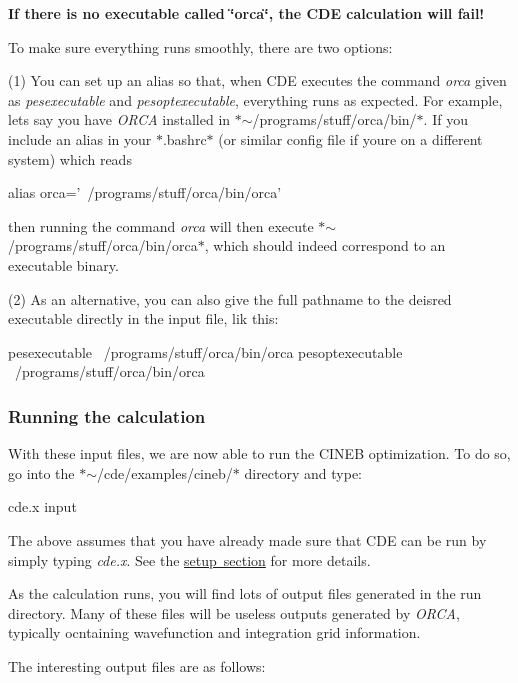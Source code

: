 {\bfseries If there is no executable called \char`\"{}orca\char`\"{}, the C\+DE calculation will fail!}

To make sure everything runs smoothly, there are two options\+:

(1) You can set up an alias so that, when C\+DE executes the command {\itshape orca} given as {\itshape pesexecutable} and {\itshape pesoptexecutable}, everything runs as expected. For example, lets say you have {\itshape O\+R\+CA} installed in $\ast$$\sim$/programs/stuff/orca/bin/$\ast$. If you include an alias in your $\ast$.bashrc$\ast$ (or similar config file if you\textquotesingle{}re on a different system) which reads \begin{DoxyVerb}alias orca='~/programs/stuff/orca/bin/orca'
\end{DoxyVerb}


then running the command {\itshape orca} will then execute $\ast$$\sim$/programs/stuff/orca/bin/orca$\ast$, which should indeed correspond to an executable binary.

(2) As an alternative, you can also give the full pathname to the deisred executable directly in the input file, lik this\+: \begin{DoxyVerb}  pesexecutable ~/programs/stuff/orca/bin/orca
  pesoptexecutable ~/programs/stuff/orca/bin/orca
\end{DoxyVerb}


\subsubsection*{Running the calculation}

With these input files, we are now able to run the C\+I\+N\+EB optimization. To do so, go into the $\ast$$\sim$/cde/examples/cineb/$\ast$ directory and type\+: \begin{DoxyVerb}cde.x input
\end{DoxyVerb}


The above assumes that you have already made sure that C\+DE can be run by simply typing {\itshape cde.\+x}. See the \mbox{\hyperlink{setup}{setup section}} for more details.

As the calculation runs, you will find lots of output files generated in the run directory. Many of these files will be useless outputs generated by {\itshape O\+R\+CA}, typically ocntaining wavefunction and integration grid information.

The interesting output files are as follows\+:



